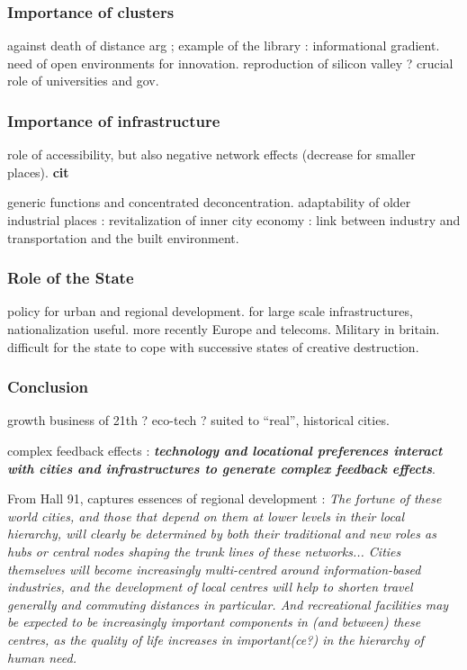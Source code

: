 \subsubsection{Importance of clusters}

against death of distance arg ; example of the library : informational gradient. need of open environments for innovation. reproduction of silicon valley ? crucial role of universities and gov.

\subsubsection{Importance of infrastructure} 

role of accessibility, but also negative network effects (decrease for smaller places). \textbf{cit}

generic functions and concentrated deconcentration. adaptability of older industrial places : revitalization of inner city economy : link between industry and transportation and the built environment.

\subsubsection{Role of the State}

policy for urban and regional development. for large scale infrastructures, nationalization useful. more recently Europe and telecoms. Military in britain. difficult for the state to cope with successive states of creative destruction.

\subsubsection{Conclusion}

growth business of 21th ? eco-tech ? suited to ``real'', historical cities.

complex feedback effects : \textbf{\textit{technology and locational preferences interact with cities and infrastructures to generate complex feedback effects}}. 

From Hall 91, captures essences of regional development : \textit{The fortune of these world cities, and those that depend on them at lower levels in their local hierarchy, will clearly be determined by both their traditional and new roles as hubs or central nodes shaping the trunk lines of these networks... Cities themselves will become increasingly multi-centred around information-based industries, and the development of local centres will help to shorten travel generally and commuting distances in particular. And recreational facilities may be expected to be increasingly important components in (and between) these centres, as the quality of life increases in important(ce?) in the hierarchy of human need.}

